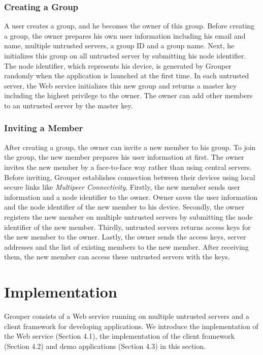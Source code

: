 \documentclass[twocolumn,10pt]{article}
\begin{document}
\subsubsection{Creating a Group}

A user creates a group, and he becomes the owner of this group.  
Before creating a group, the owner prepares his own user information including his email and name, multiple untrusted servers, a group ID and a group name. 
Next, he initializes this group on all untrusted server by submitting his node identifier. 
The node identifier, which represents his device, is generated by Grouper randomly when the application is launched at the first time. 
In each untrusted server, the Web service initializes this new group and returns a master key including the highest privilege to the owner. 
The owner can add other members to an untrusted server by the master key.

\subsubsection{Inviting a Member}

After creating a group, the owner can invite a new member to his group. 
To join the group, the new member prepares his user information at first. 
The owner invites the new member by a face-to-face way rather than using central servers. 
Before inviting, Grouper establishes connection between their devices using local secure links like \emph{Multipeer Connectivity}\cite{mc}. 
Firstly, the new member sends user information and a node identifier to the owner. 
Owner saves the user information and the node identifier of the new member to his device. 
Secondly, the owner registers the new member on multiple untrusted servers by submitting the node identifier of the new member. 
Thirdly, untrusted servers returns access keys for the new member to the owner. 
Lastly, the owner sends the access keys, server addresses and the list of existing members to the new member. 
After receiving them, the new member can access these untrusted servers with the keys.

\section{Implementation}

Grouper consists of a Web service running on multiple untrusted servers and a client framework for developing applications.
We introduce the implementation of the Web service (Section 4.1), the implementation of the client framework (Section 4.2) and demo applications (Section 4.3) in this section.
\end{document}
